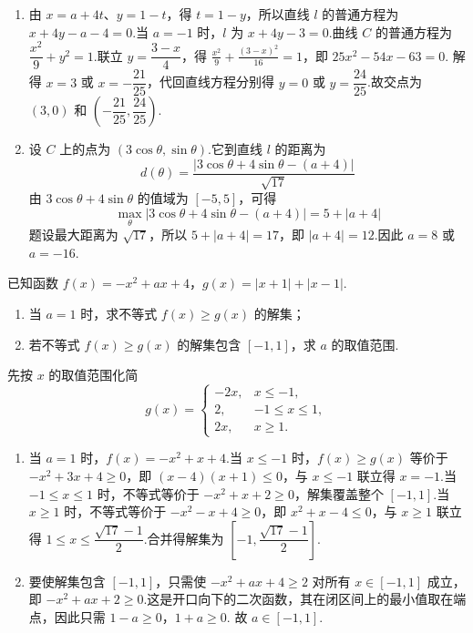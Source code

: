 \begin{solution}
\begin{enumerate}
\item 由 \(x=a+4t\)、\(y=1-t\)，得 \(t=1-y\)，所以直线 \(l\) 的普通方程为 \(x+4y-a-4=0\).当 \(a=-1\) 时，\(l\) 为 \(x+4y-3=0\).曲线 \(C\) 的普通方程为 \(\dfrac{x^2}{9}+y^2=1\).联立 \(y=\dfrac{3-x}{4}\)，得
\(\frac{x^2}{9}+\frac{(3-x)^2}{16}=1\)，即 \(25x^2-54x-63=0\).
解得 \(x=3\) 或 \(x=-\dfrac{21}{25}\)，代回直线方程分别得 \(y=0\) 或 \(y=\dfrac{24}{25}\).故交点为 \((3,0)\) 和 \(\left(-\dfrac{21}{25},\dfrac{24}{25}\right)\).
\item 设 \(C\) 上的点为 \((3\cos\theta,\sin\theta)\).它到直线 \(l\) 的距离为
\[
d(\theta)=\frac{\left|3\cos\theta+4\sin\theta-(a+4)\right|}{\sqrt{17}}
\]
由 \(3\cos\theta+4\sin\theta\) 的值域为 \([-5,5]\)，可得
\[
\max_\theta\left|3\cos\theta+4\sin\theta-(a+4)\right|
=5+|a+4|
\]
题设最大距离为 \(\sqrt{17}\)，所以 \(5+|a+4|=17\)，即 \(|a+4|=12\).因此 \(a=8\) 或 \(a=-16\).
\end{enumerate}
\end{solution}


\begin{problem}
已知函数 \(f(x)=-x^2+ax+4\)，\(g(x)=|x+1|+|x-1|\).

\begin{enumerate}
\item 当 \(a=1\) 时，求不等式 \(f(x)\ge g(x)\) 的解集；
\item 若不等式 \(f(x)\ge g(x)\) 的解集包含 \([-1,1]\)，求 \(a\) 的取值范围.
\end{enumerate}
\end{problem}

\begin{solution}
先按 \(x\) 的取值范围化简
\[
g(x)=
\begin{cases}
-2x,&x\le-1,\\
2,&-1\le x\le1,\\
2x,&x\ge1.
\end{cases}
\]
\begin{enumerate}
\item 当 \(a=1\) 时，\(f(x)=-x^2+x+4\).当 \(x\le-1\) 时，\(f(x)\ge g(x)\) 等价于 \(-x^2+3x+4\ge0\)，即 \((x-4)(x+1)\le0\)，与 \(x\le-1\) 联立得 \(x=-1\).当 \(-1\le x\le1\) 时，不等式等价于 \(-x^2+x+2\ge0\)，解集覆盖整个 \([-1,1]\).当 \(x\ge1\) 时，不等式等价于 \(-x^2-x+4\ge0\)，即 \(x^2+x-4\le0\)，与 \(x\ge1\) 联立得 \(1\le x\le\dfrac{\sqrt{17}-1}{2}\).合并得解集为 \(\left[-1,\dfrac{\sqrt{17}-1}{2}\right]\).
\item 要使解集包含 \([-1,1]\)，只需使 \(-x^2+ax+4\ge2\) 对所有 \(x\in[-1,1]\) 成立，即 \(-x^2+ax+2\ge0\).这是开口向下的二次函数，其在闭区间上的最小值取在端点，因此只需
\(1-a\ge0\)，\(1+a\ge0\).
故 \(a\in[-1,1]\).
\end{enumerate}
\end{solution}
